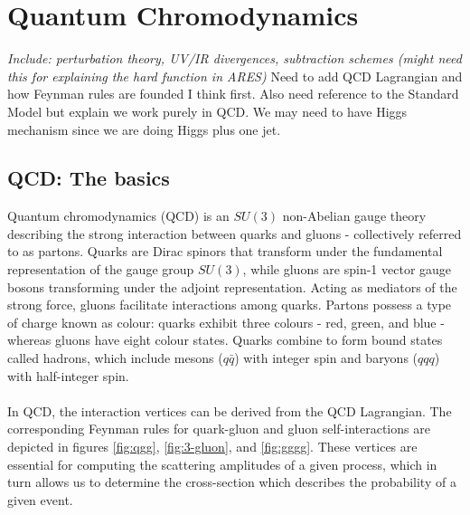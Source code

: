 \chapter{Quantum Chromodynamics}
\emph{Include: perturbation theory, UV/IR divergences, subtraction schemes (might need this for explaining the hard function in ARES)}
{\color{green} Need to add QCD Lagrangian and how Feynman rules are founded I think first. Also need reference to the Standard Model but explain we work purely in QCD. We may need to have Higgs mechanism since we are doing Higgs plus one jet.}
\section{QCD: The basics}
Quantum chromodynamics (QCD) is an $SU(3)$ non-Abelian gauge theory describing the strong interaction between quarks and gluons - collectively referred to as partons. Quarks are Dirac spinors that transform under the fundamental representation of the gauge group $SU(3)$, while gluons are spin-1 vector gauge bosons transforming under the adjoint representation. Acting as mediators of the strong force, gluons facilitate interactions among quarks. Partons possess a type of charge known as colour: quarks exhibit three colours - red, green, and blue - whereas gluons have eight colour states. Quarks combine to form bound states called hadrons, which include mesons ($q\bar{q}$) with integer spin and baryons ($qqq$) with half-integer spin. \\ \\
In QCD, the interaction vertices can be derived from the QCD Lagrangian. The corresponding Feynman rules for quark-gluon and gluon self-interactions are depicted in figures \ref{fig:qgg}, \ref{fig:3-gluon}, and \ref{fig:gggg}. These vertices are essential for computing the scattering amplitudes of a given process, which in turn allows us to determine the cross-section which describes the probability of a given event. 

